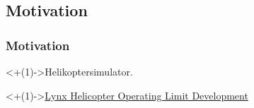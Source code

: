 \subsection{Motivation}

\begin{frame}[<+(1)->]
\frametitle{Motivation}

\uncover<+(1)->{Helikoptersimulator.}

\uncover<+(1)->{\href{http://www.youtube.com/watch?v=bC2XIGMI2kM}{Lynx Helicopter Operating Limit Development}}

\end{frame}
